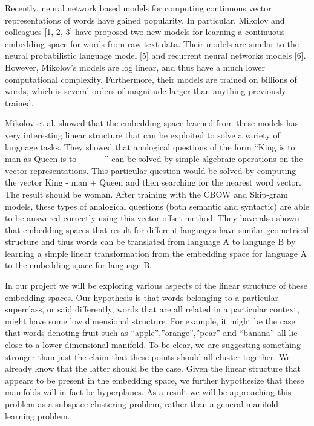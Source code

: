 Recently, neural network based models for computing continuous vector representations of words have gained popularity. 
In particular, Mikolov and colleagues [1, 2, 3] have proposed two new models for learning a continuous embedding space for words from raw text data. 
Their models are similar to the neural probabilistic language model [5] and recurrent neural networks models [6]. 
However, Mikolov’s models are log linear, and thus have a much lower computational complexity. 
Furthermore, their models are trained on billions of words, which is several orders of magnitude larger than anything previously trained.
 
Mikolov et al. showed that the embedding space learned from these models has very interesting linear structure that can be exploited to solve a variety of language tasks. 
They showed that analogical questions of the form “King is to man as Queen is to \_\_\_\_” can be solved by simple algebraic operations on the vector representations. 
This particular question would be solved by computing the vector King - man + Queen and then searching for the nearest word vector. 
The result should be woman. 
After training with the CBOW and Skip-gram models, these types of analogical questions (both semantic and syntactic) are able to be answered correctly using this vector offset method. 
They have also shown that embedding spaces that result for different languages have similar geometrical structure and thus words can be translated from language A to language B by learning a simple linear transformation from the embedding space for language A to the embedding space for language B.
 
In our project we will be exploring various aspects of the linear structure of these embedding spaces. 
Our hypothesis is that words belonging to a particular superclass, or said differently, words that are all related in a particular context, might have some low dimensional structure. 
For example, it might be the case that words denoting fruit such as “apple”,”orange”,”pear” and “banana” all lie close to a lower dimensional manifold. 
To be clear, we are suggesting something stronger than just the claim that these points should all cluster together. 
We already know that the latter should be the case. 
Given the linear structure that appears to be present in the embedding space, we further hypothesize that these manifolds will in fact be hyperplanes. 
As a result we will be approaching this problem as a subspace clustering problem, rather than a general manifold learning problem.
